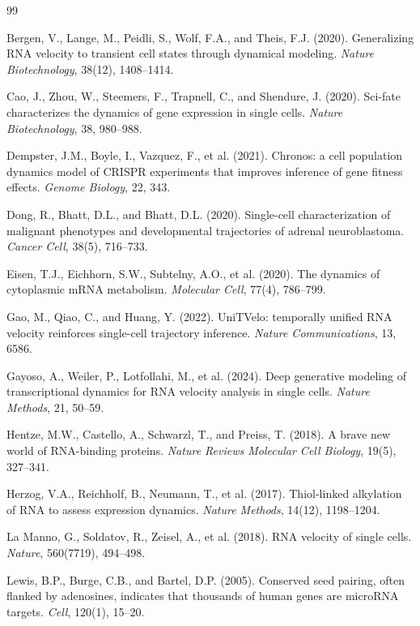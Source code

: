 \documentclass{article}
\begin{document}
\begin{thebibliography}{99}

Bergen, V., Lange, M., Peidli, S., Wolf, F.A., and Theis, F.J. (2020).
Generalizing RNA velocity to transient cell states through dynamical modeling.
\textit{Nature Biotechnology}, 38(12), 1408--1414.

Cao, J., Zhou, W., Steemers, F., Trapnell, C., and Shendure, J. (2020).
Sci-fate characterizes the dynamics of gene expression in single cells.
\textit{Nature Biotechnology}, 38, 980--988.

Dempster, J.M., Boyle, I., Vazquez, F., et al. (2021).
Chronos: a cell population dynamics model of CRISPR experiments that improves inference of gene fitness effects.
\textit{Genome Biology}, 22, 343.

Dong, R., Bhatt, D.L., and Bhatt, D.L. (2020).
Single-cell characterization of malignant phenotypes and developmental trajectories of adrenal neuroblastoma.
\textit{Cancer Cell}, 38(5), 716--733.

Eisen, T.J., Eichhorn, S.W., Subtelny, A.O., et al. (2020).
The dynamics of cytoplasmic mRNA metabolism.
\textit{Molecular Cell}, 77(4), 786--799.

Gao, M., Qiao, C., and Huang, Y. (2022).
UniTVelo: temporally unified RNA velocity reinforces single-cell trajectory inference.
\textit{Nature Communications}, 13, 6586.

Gayoso, A., Weiler, P., Lotfollahi, M., et al. (2024).
Deep generative modeling of transcriptional dynamics for RNA velocity analysis in single cells.
\textit{Nature Methods}, 21, 50--59.

Hentze, M.W., Castello, A., Schwarzl, T., and Preiss, T. (2018).
A brave new world of RNA-binding proteins.
\textit{Nature Reviews Molecular Cell Biology}, 19(5), 327--341.

Herzog, V.A., Reichholf, B., Neumann, T., et al. (2017).
Thiol-linked alkylation of RNA to assess expression dynamics.
\textit{Nature Methods}, 14(12), 1198--1204.

La Manno, G., Soldatov, R., Zeisel, A., et al. (2018).
RNA velocity of single cells.
\textit{Nature}, 560(7719), 494--498.

Lewis, B.P., Burge, C.B., and Bartel, D.P. (2005).
Conserved seed pairing, often flanked by adenosines, indicates that thousands of human genes are microRNA targets.
\textit{Cell}, 120(1), 15--20.


\end{thebibliography}
\end{document}
